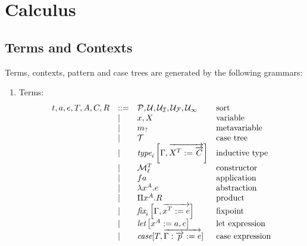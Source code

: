\section{Calculus}





\subsection{Terms and Contexts}


Terms, contexts, pattern and case trees are generated by the following grammars:

\begin{enumerate}
    \item Terms:
        $$
        \begin{array}{lllll} 
            t,a,e,T,A,C,R
            &::=&
            {\mathcal P}, {\mathcal U}, {{\mathcal U}_\mathcal I}, {{\mathcal U}_\mathcal F}, {{\mathcal U}_\infty}
            &\text{sort}
            \\
            &\mid&
            x, X
            &\text{variable}
            \\
            &\mid&
            {m_?}
            &\text{metavariable}
            \\
            &\mid&
            {\mathcal T}
            &\text{case tree}
            \\
            &\mid&
            {\text{\it type}}_i\left[ {\Gamma , {\overrightarrow {X^T := {\overrightarrow {C}}}}} \right]
            & \text{inductive type}
            \\
            &\mid&
            {\cal M}^T_{\ell}
            &\text{constructor}
            \\
            &\mid&
            f a
            & \text{application}
            \\
            &\mid&
            \lambda x^A. e
            & \text{abstraction}
            \\
            &\mid&
            \Pi x^A. R
            & \text{product}
            \\
            &\mid&
            {\text{\it fix}}_i\left[ {\Gamma, {\overrightarrow { x^T := e}}} \right]
            & \text{fixpoint}
            \\
            &\mid&
            {\text{\it let}}\left[ {x^A := a, e} \right]
            & \text{let expression}
            \\
            &\mid&
            {\text{\it case}}[T, {\overrightarrow {\Gamma: {\overrightarrow {p}} := e}}]
            & \text{case expression}
         \end{array}
        $$


\end{enumerate}
